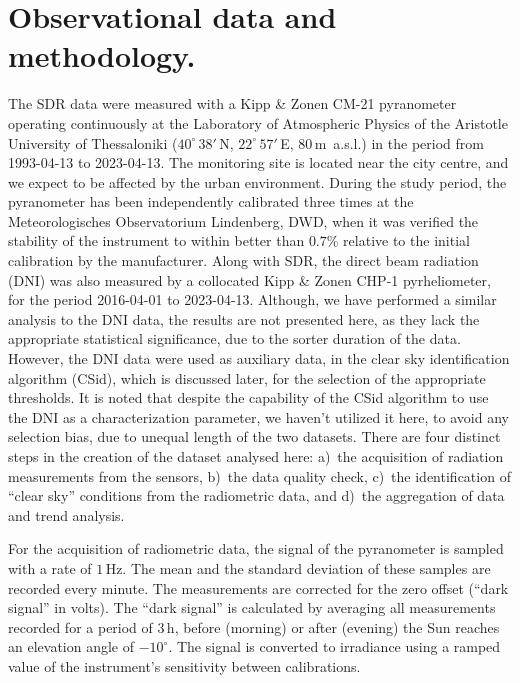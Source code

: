 \documentclass[applsci,article,submit,moreauthors,pdftex]{Definitions/mdpi}
\begin{document}
\hypertarget{observational-data-and-methodology.}{%
\section{Observational data and
methodology.}\label{observational-data-and-methodology.}}

The SDR data were measured with a Kipp \& Zonen CM-21 pyranometer
operating continuously at the Laboratory of Atmospheric Physics of the
Aristotle University of Thessaloniki (\(40^\circ\,38'\,\)N,
\(22^\circ\,57'\,\)E, \(80\,\)m~a.s.l.) in the period from 1993-04-13 to
2023-04-13. The monitoring site is located near the city centre, and we
expect to be affected by the urban environment. During the study period,
the pyranometer has been independently calibrated three times at the
Meteorologisches Observatorium Lindenberg, DWD, when it was verified the
stability of the instrument to within better than \(0.7\%\) relative to
the initial calibration by the manufacturer. Along with SDR, the direct
beam radiation (DNI) was also measured by a collocated Kipp \& Zonen
CHP-1 pyrheliometer, for the period 2016-04-01 to 2023-04-13. Although,
we have performed a similar analysis to the DNI data, the results are
not presented here, as they lack the appropriate statistical
significance, due to the sorter duration of the data. However, the DNI
data were used as auxiliary data, in the clear sky identification
algorithm (CSid), which is discussed later, for the selection of the
appropriate thresholds. It is noted that despite the capability of the
CSid algorithm to use the DNI as a characterization parameter, we
haven't utilized it here, to avoid any selection bias, due to unequal
length of the two datasets. There are four distinct steps in the
creation of the dataset analysed here: a)~the acquisition of radiation
measurements from the sensors, b)~the data quality check, c)~the
identification of ``clear sky'' conditions from the radiometric data,
and d)~the aggregation of data and trend analysis.

For the acquisition of radiometric data, the signal of the pyranometer
is sampled with a rate of \(1\,\text{Hz}\). The mean and the standard
deviation of these samples are recorded every minute. The measurements
are corrected for the zero offset (``dark signal'' in volts). The ``dark
signal'' is calculated by averaging all measurements recorded for a
period of \(3\,\text{h}\), before (morning) or after (evening) the Sun
reaches an elevation angle of \(-10^\circ\). The signal is converted to
irradiance using a ramped value of the instrument's sensitivity between
calibrations.
\end{document}
